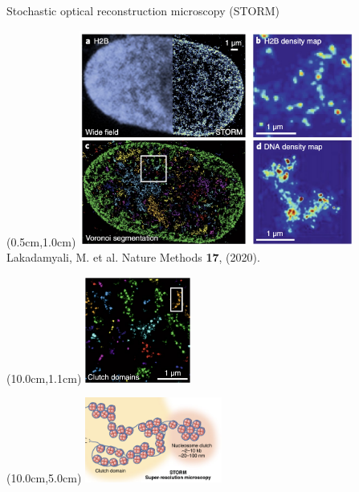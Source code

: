\documentclass{beamer}					%
\begin{document}
\begin{frame}{Stochastic optical reconstruction microscopy (STORM)}
\begin{textblock*}{9cm}(0.5cm,1.0cm)
\includegraphics[width=9cm]{media/STORM.png}
Lakadamyali, M. et al. Nature Methods \textbf{17}, (2020).
\end{textblock*}
\begin{textblock*}{3.5cm}(10.0cm,1.1cm)
\includegraphics[width=3.5cm]{media/ClutchDomains.png}
\end{textblock*}
\begin{textblock*}{4.5cm}(10.0cm,5.0cm)
\includegraphics[width=4.5cm]{media/ClutchCartoon.png}
\end{textblock*}
\end{frame}
\end{document}

